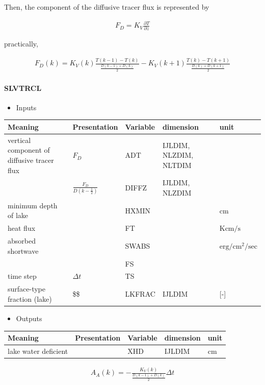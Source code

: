 Then, the component of the diffusive tracer flux is represented by

\begin{eqnarray}
    F_D = K_V \frac{\partial T}{\partial z}
\end{eqnarray}

practically,

\begin{eqnarray}
    F_D(k) = K_V(k) \frac{T(k-1)-T(k)}{\frac{D(k-1)+D(k)}{2}} - K_V(k+1) \frac{T(k)-T(k+1)}{\frac{D(k)+D(k+1)}{2}}
\end{eqnarray}

\hypertarget{slvtrcl}{%
\paragraph{SLVTRCL}\label{slvtrcl}}

\begin{itemize}
\tightlist
\item
  Inputs
\end{itemize}

\setlength\LTleft{0pt}\setlength\LTright{0pt}\begin{longtable}[]{@{}lllll@{}}
\toprule\relax
Meaning & Presentation & Variable & dimension & unit\tabularnewline
\midrule\relax
\endhead
vertical component of diffusive tracer flux & \(F_D\) & ADT & IJLDIM,
NLZDIM, NLTDIM &\tabularnewline
& \(\frac{F_D}{D(k-\frac{1}{2})}\) & DIFFZ & IJLDIM, NLZDIM
&\tabularnewline
minimum depth of lake & & HXMIN & & \(\mathrm{cm}\)\tabularnewline
heat flux & & FT & & \(\mathrm{K cm/s}\)\tabularnewline
absorbed shortwave & & SWABS & &
\(\mathrm{erg/cm^2/sec}\)\tabularnewline
& & FS & &\tabularnewline
time step & \(\Delta t\) & TS & &\tabularnewline
surface-type fraction (lake) & \$\$ & LKFRAC & IJLDIM &
{[}-{]}\tabularnewline
\bottomrule
\end{longtable}

\begin{itemize}
\tightlist
\item
  Outputs
\end{itemize}

\setlength\LTleft{0pt}\setlength\LTright{0pt}\begin{longtable}[]{@{}lllll@{}}
\toprule\relax
Meaning & Presentation & Variable & dimension & unit\tabularnewline
\midrule\relax
\endhead
lake water deficient & & XHD & IJLDIM & \(\mathrm{cm}\)\tabularnewline
\bottomrule
\end{longtable}

\begin{eqnarray}
    A_A(k) = -\frac{K_V(k)}{\frac{D(k-1)+D(k)}{2}} \Delta t
\end{eqnarray}

